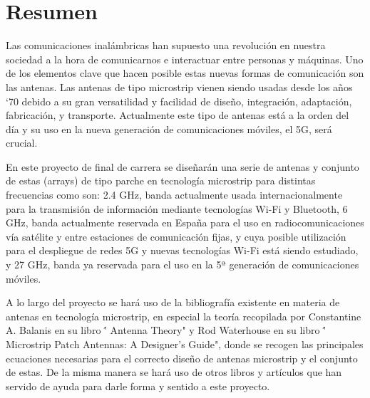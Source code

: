 \vspace{-20em}
\chapter*{Resumen}
\thispagestyle{empty}
\par Las comunicaciones inalámbricas han supuesto una revolución en nuestra sociedad a la hora de comunicarnos e interactuar entre personas y máquinas. Uno de los elementos clave que hacen posible estas nuevas formas de comunicación son las antenas. Las antenas de tipo microstrip vienen siendo usadas desde los años ‘70 debido a su gran versatilidad y facilidad de diseño, integración, adaptación, fabricación, y transporte. Actualmente este tipo de antenas está a la orden del día y su uso en la nueva generación de comunicaciones móviles, el 5G, será crucial.
\\
\par En este proyecto de final de carrera se diseñarán una serie de antenas y conjunto de estas (arrays) de tipo parche en tecnología microstrip para distintas frecuencias como son: 2.4 GHz, banda actualmente usada internacionalmente para la transmisión de información mediante tecnologías Wi-Fi y Bluetooth, 6 GHz, banda actualmente reservada en España para el uso en radiocomunicaciones vía satélite y entre estaciones de comunicación fijas, y cuya posible utilización para el despliegue de redes 5G y nuevas tecnologías Wi-Fi está siendo estudiado, y 27 GHz, banda ya reservada para el uso en la 5ª generación de comunicaciones móviles.
\\
\par A lo largo del proyecto se hará uso de la bibliografía existente en materia de antenas en tecnología microstrip, en especial la teoría recopilada por Constantine A. Balanis en su libro \'' Antenna Theory" y Rod Waterhouse en su libro \'' Microstrip Patch Antennas: A Designer's Guide", donde se recogen las principales ecuaciones necesarias para el correcto diseño de antenas microstrip y el conjunto de estas. De la misma manera se hará uso de otros libros y artículos que han servido de ayuda para darle forma y sentido a este proyecto.
\\

